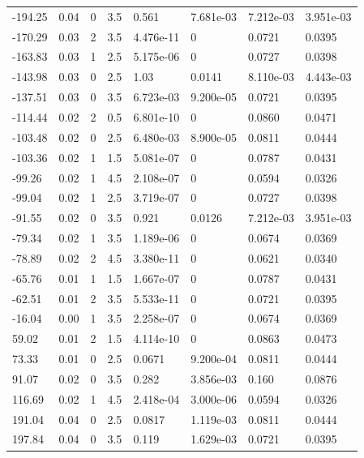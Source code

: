 \documentclass[preview]{standalone}
\begin{document}
{{\begin{tabular}{L{1.2cm}C{1.2cm} C{0.3cm}C{0.5cm} C{1.4cm}C{1.4cm} C{1.4cm}C{1.4cm}}
  -194.25  &  0.04  & 0     & 3.5 &  0.561  & 7.681e-03  & 7.212e-03 &  3.951e-03   \\ 
  -170.29  &  0.03  & 2     & 3.5 &  4.476e-11  & 0  & 0.0721 &  0.0395   \\ 
  -163.83  &  0.03  & 1     & 2.5 &  5.175e-06  & 0  & 0.0727 &  0.0398   \\ 
  -143.98  &  0.03  & 0     & 2.5 &  1.03  & 0.0141  & 8.110e-03 &  4.443e-03   \\ 
  -137.51  &  0.03  & 0     & 3.5 &  6.723e-03  & 9.200e-05  & 0.0721 &  0.0395   \\ 
  -114.44  &  0.02  & 2     & 0.5 &  6.801e-10  & 0  & 0.0860 &  0.0471   \\ 
  -103.48  &  0.02  & 0     & 2.5 &  6.480e-03  & 8.900e-05  & 0.0811 &  0.0444   \\ 
  -103.36  &  0.02  & 1     & 1.5 &  5.081e-07  & 0  & 0.0787 &  0.0431   \\ 
  -99.26  &  0.02  & 1     & 4.5 &  2.108e-07  & 0  & 0.0594 &  0.0326   \\ 
  -99.04  &  0.02  & 1     & 2.5 &  3.719e-07  & 0  & 0.0727 &  0.0398   \\ 
  -91.55  &  0.02  & 0     & 3.5 &  0.921  & 0.0126  & 7.212e-03 &  3.951e-03   \\ 
  -79.34  &  0.02  & 1     & 3.5 &  1.189e-06  & 0  & 0.0674 &  0.0369   \\ 
  -78.89  &  0.02  & 2     & 4.5 &  3.380e-11  & 0  & 0.0621 &  0.0340   \\ 
  -65.76  &  0.01  & 1     & 1.5 &  1.667e-07  & 0  & 0.0787 &  0.0431   \\ 
  -62.51  &  0.01  & 2     & 3.5 &  5.533e-11  & 0  & 0.0721 &  0.0395   \\ 
  -16.04  &  0.00  & 1     & 3.5 &  2.258e-07  & 0  & 0.0674 &  0.0369   \\ 
  59.02  &  0.01  & 2     & 1.5 &  4.114e-10  & 0  & 0.0863 &  0.0473   \\ 
  73.33  &  0.01  & 0     & 2.5 &  0.0671  & 9.200e-04  & 0.0811 &  0.0444   \\ 
  91.07  &  0.02  & 0     & 3.5 &  0.282  & 3.856e-03  & 0.160 &  0.0876   \\ 
  116.69  &  0.02  & 1     & 4.5 &  2.418e-04  & 3.000e-06  & 0.0594 &  0.0326   \\ 
  191.04  &  0.04  & 0     & 2.5 &  0.0817  & 1.119e-03  & 0.0811 &  0.0444   \\ 
  197.84  &  0.04  & 0     & 3.5 &  0.119  & 1.629e-03  & 0.0721 &  0.0395   \\ 

\end{tabular}}}
\end{document}
